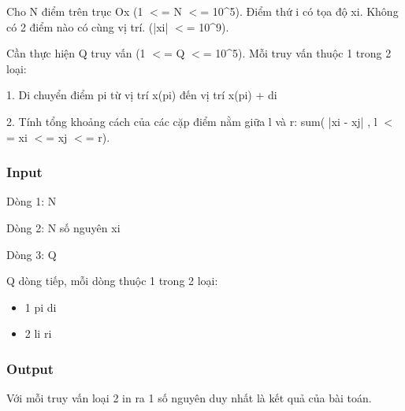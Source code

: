 

Cho N điểm trên trục Ox (1 $<$= N $<$= 10\textasciicircum5). Điểm thứ i có tọa độ xi. Không có 2 điểm nào có cùng vị trí. (|xi| $<$= 10\textasciicircum9).

Cần thực hiện Q truy vấn (1 $<$= Q $<$= 10\textasciicircum5). Mỗi truy vấn thuộc 1 trong 2 loại:

1. Di chuyển điểm pi từ vị trí x(pi) đến vị trí x(pi) + di

2. Tính tổng khoảng cách của các cặp điểm nằm giữa l và r: sum( |xi - xj| , l $<$= xi $<$= xj $<$= r).

\subsubsection{Input}

Dòng 1: N

Dòng 2: N số nguyên xi

Dòng 3: Q

Q dòng tiếp, mỗi dòng thuộc 1 trong 2 loại:
\begin{itemize}
	\item 1 pi di
	\item 2 li ri
\end{itemize}

\subsubsection{Output}

Với mỗi truy vấn loại 2 in ra 1 số nguyên duy nhất là kết quả của bài toán.


